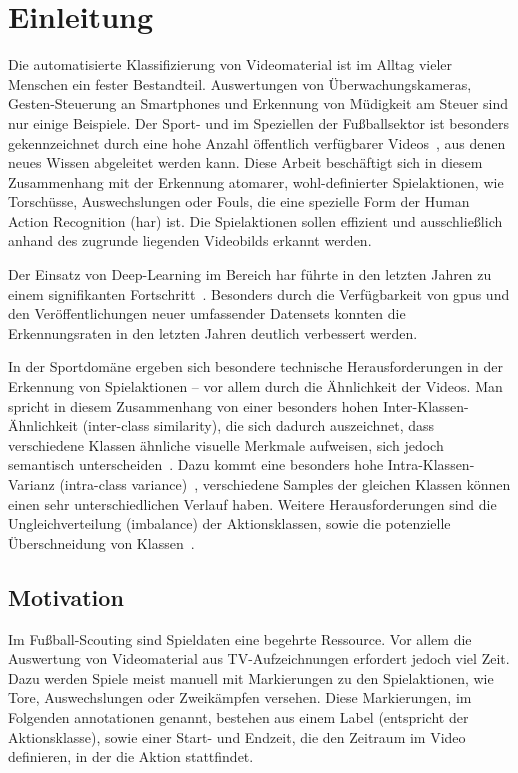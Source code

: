 \chapter{Einleitung}
\label{ch:intro}

Die automatisierte Klassifizierung von Videomaterial ist im Alltag vieler Menschen ein fester Bestandteil.
Auswertungen von Überwachungskameras, Gesten-Steuerung an Smartphones und Erkennung von Müdigkeit am Steuer sind nur einige Beispiele.
Der Sport- und im Speziellen der Fußballsektor ist besonders gekennzeichnet durch eine hohe Anzahl öffentlich verfügbarer Videos~\cite{Giancola18}, aus denen neues Wissen abgeleitet werden kann.
Diese Arbeit beschäftigt sich in diesem Zusammenhang mit der Erkennung atomarer, wohl-definierter Spielaktionen, wie Torschüsse, Auswechslungen oder Fouls, die eine spezielle Form der Human Action Recognition (\gls{har}) ist.
Die Spielaktionen sollen effizient und ausschließlich anhand des zugrunde liegenden Videobilds erkannt werden.

Der Einsatz von Deep-Learning im Bereich \gls{har} führte in den letzten Jahren zu einem signifikanten Fortschritt~\cite{Abu-Bakar19}.
Besonders durch die Verfügbarkeit von \glspl{gpu} und den Veröffentlichungen neuer umfassender Datensets konnten die Erkennungsraten in den letzten Jahren deutlich verbessert werden. %

In der Sportdomäne ergeben sich besondere technische Herausforderungen in der Erkennung von Spielaktionen -- vor allem durch die Ähnlichkeit der Videos.
Man spricht in diesem Zusammenhang von einer besonders hohen Inter-Klassen-Ähnlichkeit (inter-class similarity), die sich dadurch auszeichnet, dass verschiedene Klassen ähnliche visuelle Merkmale aufweisen, sich jedoch semantisch unterscheiden~\cite{Sozykin17}.
Dazu kommt eine besonders hohe Intra-Klassen-Varianz (intra-class variance)~\cite{Ballan09}, \dh verschiedene Samples der gleichen Klassen können einen sehr unterschiedlichen Verlauf haben.
Weitere Herausforderungen sind die Ungleichverteilung (imbalance) der Aktionsklassen, sowie die potenzielle Überschneidung von Klassen~\cite{Jiang19}.

\section{Motivation}
\label{sec:motivation}

Im Fußball-Scouting sind Spieldaten eine begehrte Ressource.
Vor allem die Auswertung von Videomaterial aus TV-Aufzeichnungen erfordert jedoch viel Zeit.
Dazu werden Spiele meist manuell mit Markierungen zu den Spielaktionen, wie Tore, Auswechslungen oder Zweikämpfen versehen.
Diese Markierungen, im Folgenden \gls{annotationen} genannt, bestehen aus einem Label (entspricht der Aktionsklasse), sowie einer Start- und Endzeit, die den Zeitraum im Video definieren, in der die Aktion stattfindet.

